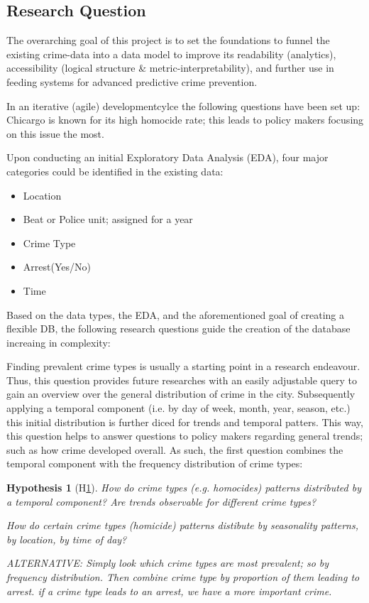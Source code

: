 \documentclass[a4paper]{article}
\newtheorem{hyp}{Hypothesis}
\begin{document}
\subsection{Research Question}
The overarching goal of this project is to set the foundations to funnel the existing crime-data into a data model to improve its readability (analytics), accessibility (logical structure \& metric-interpretability), and further use in feeding systems for advanced predictive crime prevention. 


In an iterative (agile) developmentcylce the following questions have been set up: Chicargo is known for its high homocide rate; this leads to policy makers focusing on this issue the most. 

Upon conducting an initial Exploratory Data Analysis (EDA),  four major categories could be identified in the existing data: 

\begin{itemize}
  \item Location
  \item Beat or Police unit; assigned for a year
  \item Crime Type
  \item Arrest(Yes/No)
  \item Time 
\end{itemize}

Based on the data types, the EDA, and the aforementioned goal of creating a flexible DB, the following research questions guide the creation of the database increaing in complexity:

Finding prevalent crime types is usually a starting point in a research endeavour. Thus, this question provides future researches with an easily adjustable query to gain an overview over the general distribution of crime in the city. Subsequently applying a temporal component (i.e. by day of week,  month, year, season, etc.) this initial distribution is further diced for trends and temporal patters. This way, this question helps to answer questions to policy makers regarding general trends; such as how crime developed overall. As such, the first question combines the temporal component with the frequency distribution of crime types:

\begin{hyp}[H\ref{hyp:first}] \label{hyp:first}
How do crime types (e.g. homocides) patterns distributed by a temporal component? Are trends observable for different crime types?

How do certain crime types (homicide) patterns distibute by seasonality patterns, by location, by time of day?


ALTERNATIVE: Simply look which crime types are most prevalent; so by frequency distribution. Then combine crime type by proportion of them leading to arrest. if a crime type leads to an arrest, we have a more important crime.
\end{hyp}
\end{document}
